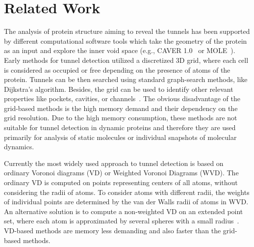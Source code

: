 \documentclass{svmult}
\newcommand{\red}[1]{\textcolor{red}{#1}}
\begin{document}


\section{Related Work}


The analysis of protein structure aiming to reveal the tunnels has been supported by different computational software tools which take the geometry of the protein as an input and explore the inner void space (e.g., CAVER 1.0~\cite{petrek2006caver} or MOLE~\cite{Petrek20071357}). 
Early methods for tunnel detection utilized a discretized 3D grid, where each cell is considered as occupied or free depending
on the presence of atoms of the protein.
Tunnels can be then searched using standard graph-search methods, like Dijkstra's algorithm.
Besides, the grid can be used to identify other relevant properties like 
pockets, cavities, or channels~\cite{sehnal2013mole,petrek2006caver}.
The obvious disadvantage of the grid-based methods is the high memory demand and their dependency on the grid resolution.
Due to the high memory consumption, these methods are not suitable for tunnel detection in dynamic proteins and therefore they
are used primarily for analysis of static molecules or individual snapshots of molecular dynamics.

Currently the most widely used approach to tunnel detection is based on ordinary Voronoi diagrams (VD) or Weighted Voronoi Diagrams (WVD).
The ordinary VD is computed on points representing centers of all atoms, without considering the radii of atoms.
To consider atoms with different radii, the weights of individual points are determined by the van der Walls radii of atoms in WVD.
An alternative solution is to compute a non-weighted VD on an extended point set, where 
each atom is approximated by several spheres with a small radius~\cite{yaffe2008,caver3}.
VD-based methods are memory less demanding and also faster than the grid-based methods.
\end{document}
